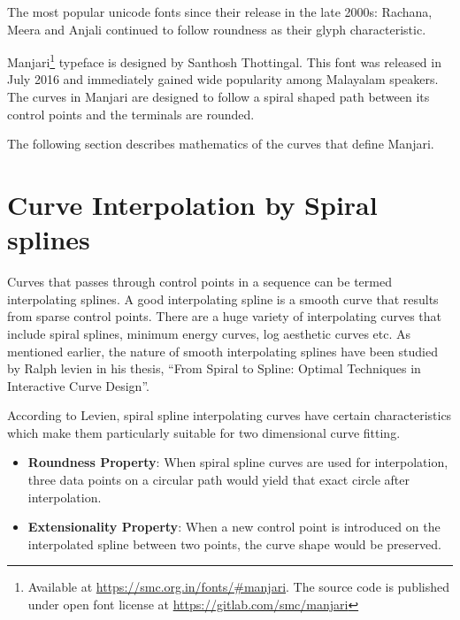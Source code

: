 \documentclass[10pt]{article}
\begin{document}
 
The most popular unicode fonts since their release in the late 2000s: Rachana, Meera and Anjali continued to follow roundness as their glyph characteristic. 

Manjari\footnote{Available at \url{https://smc.org.in/fonts/\#manjari}. The source code is published under open font license at \url{https://gitlab.com/smc/manjari}} typeface is designed by Santhosh Thottingal. This font was released in July 2016 and immediately gained wide popularity among Malayalam speakers. The curves in Manjari are designed to follow a spiral shaped path between its control points and the terminals are rounded. %

 
 The following section describes mathematics of the curves that define Manjari. 
 


\section{Curve Interpolation by Spiral splines}

Curves that passes through control points in a sequence can be termed interpolating splines. A good interpolating spline is a smooth curve that results from sparse control points. There are a huge variety of interpolating curves that include spiral splines, minimum energy curves, log aesthetic curves etc. As mentioned earlier, the nature of smooth interpolating splines have been studied by Ralph levien in his thesis, ``From Spiral to Spline: Optimal Techniques in Interactive Curve Design”\cite{levien}.

According to Levien, spiral spline interpolating curves have certain characteristics which make them particularly suitable for two dimensional curve fitting.
\begin{itemize}
	
	\item \textbf{Roundness Property}: When spiral spline curves are used for interpolation, three data points on a circular path would yield that exact circle after interpolation.
	\item \textbf{Extensionality Property}: When a new control point is introduced on the interpolated spline between two points, the curve shape would be preserved.
\end{itemize}
\end{document}
